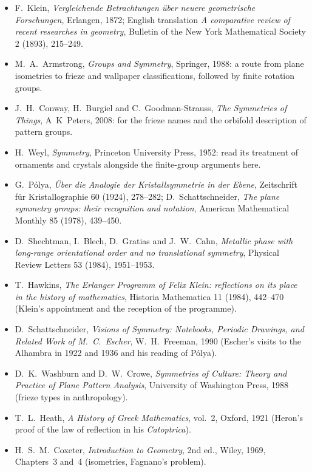 \begin{itemize}
\item F.~Klein, \emph{Vergleichende Betrachtungen \"uber neuere geometrische Forschungen}, Erlangen, 1872; English translation \emph{A
comparative review of recent researches in geometry}, Bulletin of the New York Mathematical Society 2 (1893), 215--249.
\item M.~A.~Armstrong, \emph{Groups and Symmetry}, Springer, 1988: a route from plane isometries to frieze and wallpaper classifications, followed by finite rotation groups.
\item J.~H.~Conway, H.~Burgiel and C.~Goodman-Strauss, \emph{The Symmetries of Things}, A~K~Peters, 2008: for the frieze names and the orbifold description of pattern groups.
\item H.~Weyl, \emph{Symmetry}, Princeton University Press, 1952: read its treatment of ornaments and crystals alongside the finite-group arguments here.
\item G.~P\'olya, \emph{\"Uber die Analogie der Kristallsymmetrie in der Ebene}, Zeitschrift f\"ur Kristallographie 60 (1924), 278--282;
D.~Schattschneider, \emph{The plane symmetry groups: their recognition and notation}, American Mathematical Monthly 85 (1978), 439--450.
\item D.~Shechtman, I.~Blech, D.~Gratias and J.~W.~Cahn, \emph{Metallic phase with long-range orientational order and no translational
symmetry}, Physical Review Letters 53 (1984), 1951--1953.
\item T.~Hawkins, \emph{The Erlanger Programm of Felix Klein: reflections on its place in the history of mathematics}, Historia
Mathematica 11 (1984), 442--470 (Klein's appointment and the reception of the programme).
\item D.~Schattschneider, \emph{Visions of Symmetry: Notebooks, Periodic Drawings, and Related Work of M.~C.~Escher}, W.~H.~Freeman, 1990
(Escher's visits to the Alhambra in 1922 and 1936 and his reading of P\'olya).
\item D.~K.~Washburn and D.~W.~Crowe, \emph{Symmetries of Culture: Theory and Practice of Plane Pattern Analysis}, University of Washington
Press, 1988 (frieze types in anthropology).
\item T.~L.~Heath, \emph{A History of Greek Mathematics}, vol.~2, Oxford, 1921 (Heron's proof of the law of reflection in his
\emph{Catoptrica}).
\item H.~S.~M.~Coxeter, \emph{Introduction to Geometry}, 2nd ed., Wiley, 1969, Chapters~3 and~4 (isometries, Fagnano's problem).
\end{itemize}
